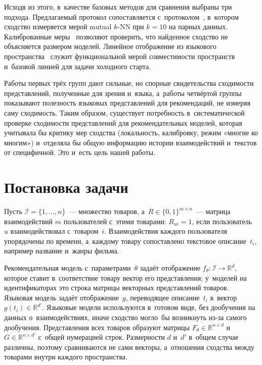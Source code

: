 \documentclass[a4paper,12pt]{article}
\begin{document}
Исходя из этого, в~качестве базовых методов для сравнения выбраны три подхода.
Предлагаемый протокол сопоставляется с~протоколом~\cite{huh2024platonic}, в~котором
сходство измеряется мерой mutual $k$-NN при $k = 10$ на парных данных. Калиброванные
меры~\cite{groger2026aristotelian} позволяют проверить, что найденное сходство
не объясняется размером моделей. Линейное отображение из языкового
пространства~\cite{sheng2025alpharec} служит функциональной мерой совместимости
пространств и~базовой линией для задачи холодного старта.

Работы первых трёх групп дают сильные, но спорные свидетельства сходимости
представлений, полученные для зрения и~языка, а~работы четвёртой группы показывают
полезность языковых представлений для рекомендаций, не измеряя саму сходимость.
Таким образом, существует потребность в~систематической проверке сходимости
представлений для рекомендательных моделей, которая учитывала бы критику мер сходства
(локальность, калибровку, режим «многие ко многим») и~отделяла бы общую информацию
истории взаимодействий и~текстов от специфичной. Это и~есть цель нашей работы.

\section{Постановка задачи}\label{sec:problem}

Пусть $\mathcal{I}=\{1,\dots,n\}$~--- множество товаров, а~$R\in\{0,1\}^{m\times n}$~---
матрица взаимодействий $m$ пользователей с~этими товарами: $R_{ui}=1$, если
пользователь~$u$ взаимодействовал с~товаром~$i$. Взаимодействия каждого пользователя
упорядочены по времени, а~каждому товару сопоставлено текстовое описание~$t_i$,
например название и~жанры фильма.

Рекомендательная модель с~параметрами~$\theta$ задаёт отображение
$f_\theta\colon\mathcal{I}\to\mathbb{R}^{d}$, которое ставит в~соответствие товару вектор
его представления; у~моделей на идентификаторах это строка матрицы векторных
представлений товаров. Языковая модель задаёт отображение~$g$, переводящее
описание~$t_i$ в~вектор $g(t_i)\in\mathbb{R}^{d'}$. Языковые модели используются
в~готовом виде, без дообучения на данных о~взаимодействиях, иначе сходство могло~бы
возникнуть из-за самого дообучения. Представления всех товаров образуют матрицы
$F_\theta\in\mathbb{R}^{n\times d}$ и~$G\in\mathbb{R}^{n\times d'}$ с~общей нумерацией
строк. Размерности $d$ и~$d'$ в~общем случае различны, поэтому сравниваются не сами
векторы, а~отношения сходства между товарами внутри каждого пространства.
\end{document}
